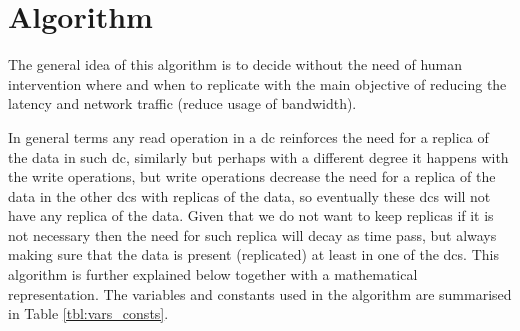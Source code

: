 \documentclass[english]{article}
\begin{document}
\section{Algorithm}
The general idea of this algorithm is to decide without the need of human intervention where and when to replicate with the main objective of reducing the latency and network traffic (reduce usage of bandwidth).

In general terms any read operation in a \gls{dc} reinforces the need for a replica of the data in such \gls{dc}, similarly but perhaps with a different degree it happens with the write operations, but write operations decrease the need for a replica of the data in the other \glspl{dc} with replicas of the data, so eventually these \glspl{dc} will not have any replica of the data. Given that we do not want to keep replicas if it is not necessary then the need for such replica will decay as time pass, but always making sure that the data is present (replicated) at least in one of the \glspl{dc}. This algorithm is further explained below together with a mathematical representation. The variables and constants used in the algorithm are summarised in Table \ref{tbl:vars_consts}.
\end{document}
